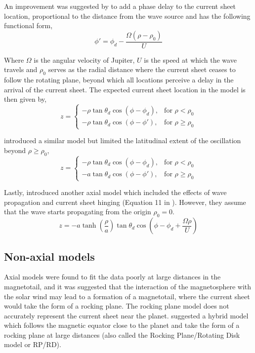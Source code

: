 An improvement was suggested by  to add a phase delay to the current sheet location, proportional to the distance from the wave source and has the following functional form,
\begin{equation}
    \phi' = \phi_d - \frac{\Omega \left( \rho - \rho_0\right)}{U}
\end{equation}

Where $\Omega$ is the angular velocity of Jupiter, $U$ is the speed at which the wave travels and $\rho_0$ serves as the radial distance where the current sheet ceases to follow the rotating plane, beyond which all locations perceive a delay in the arrival of the current sheet. The expected current sheet location in the  model is then given by,
\begin{equation}
    z = \begin{cases}
    -\rho \tan\theta_d \cos\left(\phi - \phi_d\right), & \text{for } \rho < \rho_0\\
    -\rho \tan\theta_d \cos\left(\phi - \phi'\right),  & \text{for } \rho \geq \rho_0
    \end{cases}
    \label{eqn:kivelson1978}
\end{equation}

 introduced a similar model but limited the latitudinal extent of the oscillation beyond $\rho \geq \rho_0$,
\begin{equation}
    z = \begin{cases}
    -\rho \tan\theta_d \cos\left(\phi - \phi_d\right), & \text{for } \rho < \rho_0\\
    -a \tan\theta_d \cos\left(\phi - \phi'\right),  & \text{for } \rho \geq \rho_0
    \end{cases}
\end{equation}

Lastly,  introduced another axial model which included the effects of wave propagation and current sheet hinging (Equation 11 in ). However, they assume that the wave starts propagating from the origin $\rho_0=0$.
\begin{equation}
    z = -a \tanh\left(\frac{\rho}{a}\right) \tan\theta_d \cos\left(\phi - \phi_d + \frac{\Omega \rho}{U}\right)
    \label{eqn:behannon1981}
\end{equation}

\subsection{Non-axial models}
Axial models were found to fit the data poorly at large distances in the magnetotail, and it was suggested that the interaction of the magnetosphere with the solar wind may lead to a formation of a magnetotail, where the current sheet would take the form of a rocking plane. The rocking plane model does not accurately represent the current sheet near the planet.  suggested a hybrid model which follows the magnetic equator close to the planet and take the form of a rocking plane at large distances (also called the Rocking Plane/Rotating Disk model or RP/RD).

